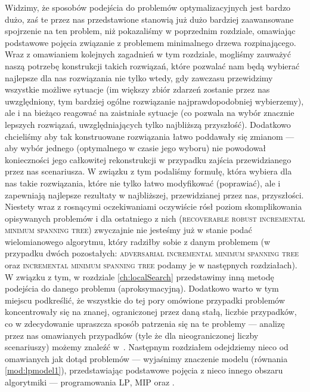 Widzimy, że sposobów podejścia do problemów optymalizacyjnych jest bardzo dużo, zaś te przez nas przedstawione stanowią już dużo bardziej zaawansowane spojrzenie na ten problem, niż pokazaliśmy w poprzednim rozdziale, omawiając podstawowe pojęcia związanie z problemem minimalnego drzewa rozpinającego. Wraz z omawianiem kolejnych zagadnień w tym rozdziale, mogliśmy zauważyć naszą potrzebę konstrukcji takich rozwiązań, które pozwalać nam będą wybierać najlepsze dla nas rozwiązania nie tylko wtedy, gdy zawczasu przewidzimy wszystkie możliwe sytuacje (im większy zbiór zdarzeń zostanie przez nas uwzględniony, tym bardziej ogólne rozwiązanie najprawdopodobniej wybierzemy), ale i na bieżąco reagować na zaistniałe sytuacje (co pozwala na wybór znacznie lepszych rozwiązań, uwzględniających tylko najbliższą przyszłość). Dodatkowo chcieliśmy aby tak konstruowane rozwiązania łatwo poddawały się zmianom --- aby wybór jednego (optymalnego w czasie jego wyboru) nie powodował konieczności jego całkowitej rekonstrukcji w przypadku zajścia przewidzianego przez nas scenariusza. W związku z tym podaliśmy formułę, która wybiera dla nas takie rozwiązania, które nie tylko łatwo modyfikować (poprawiać), ale i zapewniają najlepsze rezultaty w najbliższej, przewidzianej przez nas, przyszłości. Niestety wraz z rosnącymi oczekiwaniami oczywiście rósł poziom skomplikowania opisywanych problemów i dla ostatniego z nich (\textsc{recoverable robust incremental minimum spanning tree}) zwyczajnie nie jesteśmy już w stanie podać wielomianowego algorytmu, który radziłby sobie z danym problemem (w przypadku dwóch pozostałych: \textsc{adversarial incremental minimum spanning tree} oraz \textsc{incremental minimum spanning tree} podamy je w następnych rozdziałach). W związku z tym, w rozdziale \ref{ch:localSearch} przedstawimy inną metodę podejścia do danego problemu (aproksymacyjną). Dodatkowo warto w tym miejscu podkreślić, że wszystkie do tej pory omówione przypadki problemów koncentrowały się na znanej, ograniczonej przez daną stałą, liczbie przypadków, co w zdecydowanie upraszcza sposób patrzenia się na te problemy --- analizę przez nas omawianych przypadków (tyle że dla nieograniczonej liczby scenariuszy) możemy znaleźć w~\cite{DBLP:journals/ipl/KasperskiZ09}. Następnym rozdziałem odejdziemy nieco od omawianych jak dotąd problemów --- wyjaśnimy znaczenie modelu (równania \ref{mod:lpmodel1}), przedstawiając podstawowe pojęcia z nieco innego obszaru algorytmiki --- programowania \textsc{LP}, \textsc{MIP} oraz .